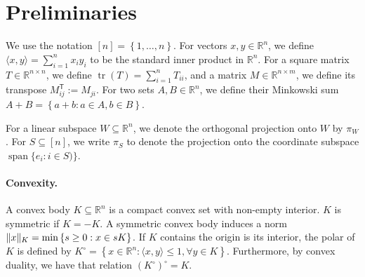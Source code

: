 \documentclass[11pt]{article}
\newcommand{\R}{{\mathbb{R}}}
\newcommand{\T}{\mathsf T}
\newcommand{\eqdef}{\triangleq}
\newcommand{\inner}[2]{\langle #1, #2 \rangle}
\newcommand{\set}[1]{\left\{ #1 \right\}}
\DeclareMathOperator{\vollb}{volLB}
\DeclareMathOperator{\vol}{vol}
\DeclareMathOperator{\lspan}{span}
\DeclareMathOperator{\tr}{tr}
\DeclarePairedDelimiter\norm{\lVert}{\rVert}
\begin{document}


\section{Preliminaries}
\label{sec:prelims}

We use the notation $[n] = \set{1,\dots,n}$. For vectors $x,y \in \R^n$, we
define $\inner{x}{y} = \sum_{i=1}^n x_i y_i$ to be the standard inner product in
$\R^n$. For a square matrix $T \in \R^{n \times n}$, we define $\tr(T) =
\sum_{i=1}^n T_{ii}$, and a matrix $M \in \R^{n \times m}$, we define its
transpose $M^\T_{ij} := M_{ji}$. For two sets $A,B \in \R^n$, we define their
Minkowski sum $A+B = \set{a+b: a \in A,b \in B}$.

For a linear subspace $W \subseteq \R^n$, we denote the orthogonal projection
onto $W$ by $\pi_W$. For $S \subseteq [n]$, we write $\pi_S$ to denote the
projection onto the coordinate subspace $\lspan\{e_i: i \in S)\}$.

\paragraph{\bf Convexity.} A convex body $K \subseteq \R^n$ is a compact convex
set with non-empty interior. $K$ is symmetric if $K = -K$. A symmetric convex
body induces a norm $\norm{x}_K = \min \set{s \geq 0: x \in sK}$. If $K$
contains the origin is its interior, the polar of $K$ is defined by $K^\circ =
\set{x \in \R^n: \inner{x}{y} \leq 1, \forall y \in K}$. Furthermore, by convex
duality, we have that relation $(K^{\circ})^\circ = K$. 
\end{document}
